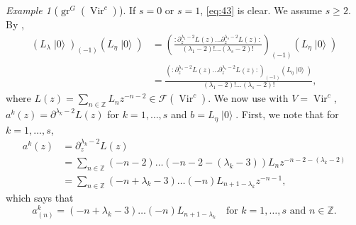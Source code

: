 \documentclass[a4paper, 12pt, reqno]{amsart}
\theoremstyle{remark}
\newtheorem{example}[theorem]{Example}
\DeclareMathOperator{\Vir}{Vir}
\DeclareMathOperator{\gr}{gr}
\DeclareMathOperator{\vac}{|0\rangle}
\begin{document}
\begin{example}[$\gr^G(\Vir^c)$]
  If $s = 0$ or $s = 1$, \eqref{eq:43} is clear.
  We assume $s \ge 2$.
  By ,
  \begin{align*}
    (L_{\lambda}\vac)_{(-1)}(L_{\eta}\vac) &= \left(\frac{:\partial_z^{\lambda_1 - 2}L(z)\dots\partial_z^{\lambda_s - 2}L(z):}{(\lambda_1 - 2)!\dots(\lambda_s - 2)!} \right)_{(-1)}(L_{\eta}\vac) \\
                                           &= \frac{(:\partial_z^{\lambda_1 - 2}L(z)\dots\partial_z^{\lambda_s - 2}L(z):)_{(-1)}(L_{\eta}\vac)}{(\lambda_1 - 2)!\dots(\lambda_s - 2)!},
  \end{align*}
  where $L(z) = \sum_{n \in \mathbb{Z}}L_nz^{-n - 2} \in \mathcal{F}(\Vir^c)$.
  We now use  with $V = \Vir^c$, $a^k(z) = \partial^{\lambda_k - 2}L(z)$ for $k = 1, \dots, s$ and $b = L_{\eta}\vac$.
  First, we note that for $k = 1, \dots, s$,
  \begin{align*}
    a^k(z) &= \partial_z^{\lambda_k - 2}L(z) \\
           &= \sum_{n \in \mathbb{Z}}(-n - 2)\dots(-n - 2 - (\lambda_k - 3))L_nz^{-n - 2 - (\lambda_k - 2)} \\
           &= \sum_{n \in \mathbb{Z}}(-n + \lambda_k - 3)\dots(-n)L_{n + 1 - \lambda_k}z^{-n - 1},
  \end{align*}
  which says that
  \begin{equation*}
    a^k_{(n)} = (-n + \lambda_k - 3)\dots(-n)L_{n + 1 - \lambda_k} \quad \text{for $k = 1, \dots, s$ and $n \in \mathbb{Z}$}.
  \end{equation*}


\end{example}
\end{document}
